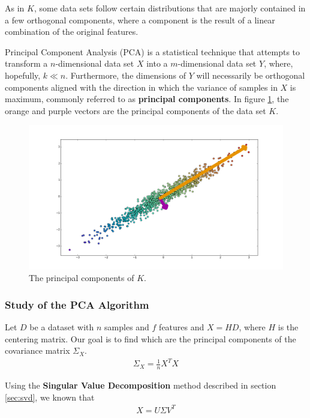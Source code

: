 \documentclass[12pt]{article}
\begin{document}
As in $K$, some data sets follow certain distributions that are majorly contained in a few orthogonal components, where a component is the result of a linear combination of the original features.

Principal Component Analysis (PCA) is a statistical technique that attempts to transform a $n$-dimensional data set $X$ into a $m$-dimensional data set $Y$, where, hopefully, $k \ll n$. Furthermore, the dimensions of $Y$ will necessarily be orthogonal components aligned with the direction in which the variance of samples in $X$ is maximum, commonly referred to as \textbf{principal components}. \cite{pca1989} In figure \ref{fig:datasetrpc}, the orange and purple vectors are the principal components of the data set $K$.

\begin{figure}[H]
	\centering
	\captionsetup{justification=centering}
	\includegraphics[width=.8\linewidth]{datasets/r_pcs}
	\caption{The principal components of $K$.}
	\label{fig:datasetrpc}
\end{figure}

\subsubsection{Study of the PCA Algorithm}

Let $D$ be a dataset with $n$ samples and $f$ features and $X=HD$, where $H$ is the centering matrix. Our goal is to find which are the principal components of the covariance matrix $\Sigma_X$.
\begin{align}
	\label{eq:pca-cov}
	\Sigma_X=\frac{1}{n} X^TX
\end{align}

Using the \textbf{Singular Value Decomposition} method described in section \ref{sec:svd}, we known that
\begin{align}
	\label{eq:pca-svd}
	X = U\Sigma V^T
\end{align}
\end{document}
